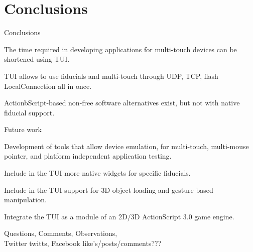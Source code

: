 \section{Conclusions}
\begin{frame}%
\begin{block}{Conclusions}
\begin{itemize}
\begin{minipage}{.9\linewidth} 
\item The time required in developing applications for multi-touch devices can be shortened using TUI.\\
\item TUI allows to use fiducials and multi-touch through UDP, TCP, flash LocalConnection all in once. \\
\item ActionbScript-based non-free software alternatives exist, but not with native fiducial support. 
\end{minipage}
\end{itemize}
\end{block}
\end{frame}

\begin{frame}%
\begin{block}{Future work}
\begin{itemize}
\begin{minipage}{.9\linewidth} 
\item Development of tools that allow device emulation, for multi-touch, multi-mouse pointer, and platform independent application testing.\\
\item Include in the TUI more native widgets for specific fiducials.\\
\item Include in the TUI support for 3D object loading and gesture based manipulation.\\
\item Integrate the TUI as a module of an 2D/3D ActionScript 3.0 game engine.
\end{minipage}
\end{itemize}
\end{block}
\end{frame}

\begin{frame}%
\begin{block}{}
\begin{center}
Questions, Comments, Observations, \\
Twitter twitts, Facebook like's/posts/comments???
\end{center}
\end{block}
\end{frame}